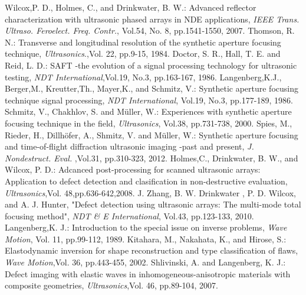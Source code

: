 ﻿\documentclass{jjsce}
\begin{document}
\begin{thebibliography}{9}
	Wilcox,P. D., Holmes, C., and Drinkwater, B. W.:
	Advanced reflector characterization with ultrasonic phased arrays in NDE applications,
	\textit{ IEEE Trans. Ultraso. Feroelect. Freq. Contr.}, Vol.54, No. 8, pp.1541-1550, 2007.
	Thomson, R. N.:
	Transverse and longitudinal resolution of the synthetic aperture focusing technique,
	\textit{Ultrasonics}.,Vol. 22, pp.9-15, 1984. 
	Doctor, S. R., Hall, T. E. and Reid, L. D.:
	SAFT -the evolution of a signal processing technology for ultrasonic testing,
	\textit{ NDT International},Vol.19, No.3, pp.163-167, 1986. 
	Langenberg,K.J., Berger,M., Kreutter,Th., Mayer,K., and Schmitz, V.:
	Synthetic aperture focusing technique signal processing,
	\textit{NDT International}, Vol.19, No.3, pp.177-189, 1986.
	Schmitz, V.,  Chakhlov, S. and M\"{u}ller, W.:
	Experiences with synthetic aperture focusing technique in the field,
	\textit{ Ultrasonics}, Vol.38, pp.731-738, 2000.
	Spies, M., Rieder, H., Dillh\"{o}fer, A.,  Shmitz, V. and M\"{u}ller, W.:
	Synthetic aperture focusing and time-of-flight diffraction 
	ultrasonic imaging -past and present,
	\textit{ J. Nondestruct. Eval. },Vol.31, pp.310-323, 2012.
	Holmes,C., Drinkwater, B. W., and  Wilcox, P. D.:
	Adcanced post-processing for scanned ultrasonic arrays: Application to 
	defect detection and clasification in non-destructive evaluation,
	\textit{ Ultrasonics},Vol. 48,pp.636-642,2008.
	J. Zhang, B. W. Drinkwater , P. D. Wilcox, and A. J. Hunter,
	"Defect detection using ultrasonic arrays: The multi-mode total focusing method",
	\textit{ NDT \& E International}, Vol.43, pp.123-133, 2010.
	Langenberg,K. J.:
	Introduction to the special issue on inverse problems,
	\textit{ Wave Motion}, Vol. 11, pp.99-112, 1989.
	Kitahara, M., Nakahata, K., and Hirose, S.:
	Elastodynamic inversion for shape reconstruction and type classification of flaws,
	\textit{ Wave Motion},Vol. 36, pp.443-455, 2002.
	Shlivinski, A. and Langenberg, K. J.:
	Defect imaging with elastic waves in inhomogeneous-anisotropic materials with 
	composite geometries,
	\textit{ Ultrasonics},Vol. 46, pp.89-104, 2007.

\end{thebibliography}
\end{document}
